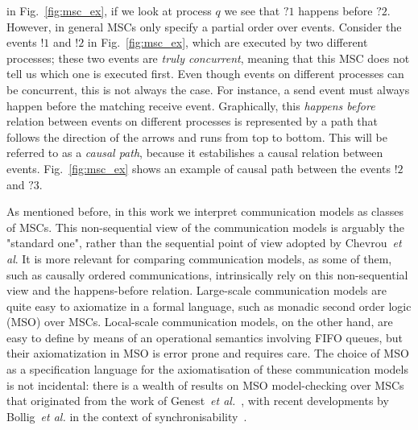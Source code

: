 in Fig.~\ref{fig:msc_ex}, if we look at process $q$ we see that $?1$ happens before $?2$. However, in general MSCs only specify a partial order
over events. Consider the events $!1$ and $!2$ in Fig.~\ref{fig:msc_ex}, which are executed by two different processes; these two events are \emph{truly concurrent}, meaning that this MSC does not tell us which one is executed first. Even though events on different processes can be concurrent, this is not always the case. For instance, a send event must always happen
before the matching receive event. Graphically, this \emph{happens before} relation between events on different processes is represented
by a path that follows the direction of the arrows and runs from top to bottom. This will be referred to as a \emph{causal path}, because it
estabilishes a causal relation between events. Fig.~\ref{fig:msc_ex} shows an example of causal path between the events $!2$ and $?3$. 






As mentioned before, in this work we interpret communication models as classes of MSCs.
This non-sequential view of the communication models is arguably the "standard one",
rather than the sequential point of view adopted by Chevrou~\emph{et al}. It is more relevant for comparing communication models, as some
of them, such as causally ordered communications, intrinsically rely on this non-sequential view and the happens-before relation. Large-scale communication models are quite easy to axiomatize in a formal language, such as monadic second order logic (MSO) over MSCs. Local-scale
communication models, on the other hand, are easy to define by means of an operational semantics involving FIFO queues, but their axiomatization
in MSO is error prone and requires care. The choice of MSO as a specification language for the axiomatisation of
these communication models is not incidental: there is a wealth of results on MSO model-checking over MSCs that originated from
the work of Genest~\emph{et al.}~\cite{genest2004kleene,GKM07}, with recent developments by Bollig~\emph{et al.} in the context
of synchronisability~\cite{BolligGFLLS21}.

